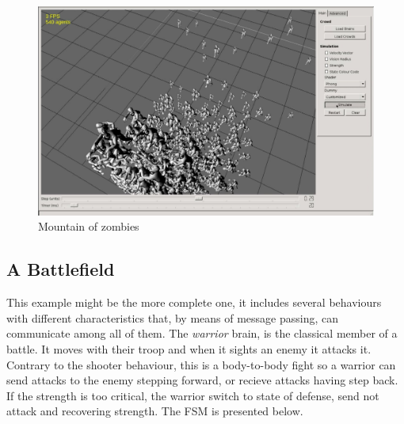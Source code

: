 \begin{figure}[!h]
  \centering
	\includegraphics[scale=0.5]{zombies_03.eps}
	\caption{Mountain of zombies}
  \label{fig:zombieCaptures}
\end{figure}

\newpage
\subsection{A Battlefield}

This example might be the more complete one, it includes several behaviours with different characteristics that, by means of message passing, can communicate among all of them. The \emph{warrior} brain, is the classical member of a battle. It moves with their troop and when it sights an enemy it attacks it. Contrary to the shooter behaviour, this is a body-to-body fight so a warrior can send attacks to the enemy stepping forward, or recieve attacks having step back. If the strength is too critical, the warrior switch to state of defense, send not attack and recovering strength. The FSM is presented below.

